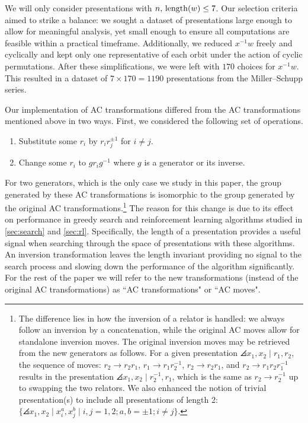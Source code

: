 We will only consider presentations with $n,\, \operatorname{length}(w) \leq 7$.
Our selection criteria aimed to strike a balance: we sought a dataset of presentations large enough to allow for meaningful analysis, yet small enough to ensure all computations are feasible within a practical timeframe.
Additionally, we reduced $x^{-1}w$ freely and cyclically and kept only one representative of each orbit under the action of cyclic permutations.
After these simplifications, we were left with $170$ choices for $x^{-1} w$.
This resulted in a dataset of $7 \times 170 = 1190$ presentations from the Miller--Schupp series.
\newline

Our implementation of AC transformations differed from the AC transformations mentioned above in two ways.
First, we considered the following set of operations.
\begin{enumerate}[label=(AC$'$\arabic*)]
	\item Substitute some $r_i$ by $r_i r_j^{\pm 1}$ for $i \neq j$.
	\item Change some $r_i$ to $g r_i g^{-1}$ where $g$ is a generator or its inverse.
\end{enumerate}
For two generators, which is the only case we study in this paper, the group generated by these AC transformations is isomorphic to the group generated by the original AC transformations.\footnote{
The difference lies in how the inversion of a relator is handled: we always follow an inversion by a concatenation, while the original AC moves allow for standalone inversion moves.
The original inversion moves may be retrieved from the new generators as follows.
For a given presentation $\angles{x_1, x_2 \mid r_1, r_2}$, the sequence of moves: $r_2 \to r_2 r_1$, $r_1 \to r_1 r_2^{-1}$, $r_2 \to r_2 r_1$, and $r_2 \to r_1 r_2 r_1^{-1}$ results in the presentation $\angles{x_1, x_2 \mid r_2^{-1}, r_1}$, which is the same as $r_2 \to r_2^{-1}$ up to swapping the two relators.
We also enhanced the notion of trivial presentation(s) to include all presentations of length 2: $\{\angles{x_1, x_2 \mid x_i^{a}, x_j^{b}}  \mid i, j = 1, 2; a, b = \pm 1; i \neq j \}$.
}
The reason for this change is due to its effect on performance in greedy search and reinforcement learning algorithms studied in \autoref{sec:search} and \autoref{sec:rl}.
Specifically, the length of a presentation provides a useful signal when searching through the space of presentations with these algorithms.
An inversion transformation leaves the length invariant providing no signal to the search process and slowing down the performance of the algorithm significantly.
For the rest of the paper we will refer to the new transformations (instead of the original AC transformations) as ``AC transformations" or ``AC moves".

